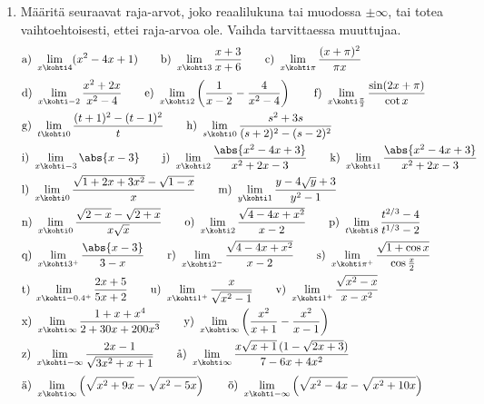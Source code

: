 \begin{enumerate}
\item
Määritä seuraavat raja-arvot, joko reaalilukuna tai muodossa $\pm\infty$, tai totea 
vaihtoehtoisesti, ettei raja-arvoa ole. Vaihda tarvittaessa muuttujaa.
\begin{align*}
&\text{a)}\ \lim_{x \kohti 4} (x^2-4x+1) \qquad
 \text{b)}\ \lim_{x \kohti 3} \frac{x+3}{x+6} \qquad
 \text{c)}\ \lim_{x\kohti\pi} \frac{(x+\pi)^2}{\pi x} \\[1mm]
&\text{d)}\ \lim_{x \kohti -2} \frac{x^2+2x}{x^2-4} \qquad
 \text{e)}\ \lim_{x \kohti 2} \left(\frac{1}{x-2}-\frac{4}{x^2-4}\right) \qquad
 \text{f)}\ \lim_{x \kohti \frac{\pi}{2}} \frac{\sin(2x+\pi)}{\cot x} \\
&\text{g)}\ \lim_{t \kohti 0} \frac{(t+1)^2-(t-1)^2}{t} \qquad
 \text{h)}\ \lim_{s \kohti 0} \frac{s^2+3s}{(s+2)^2-(s-2)^2} \\
&\text{i)}\ \lim_{x \kohti -3} \abs{x-3} \qquad
 \text{j)}\ \lim_{x \kohti 2} \frac{\abs{x^2-4x+3}}{x^2+2x-3} \qquad
 \text{k)}\ \lim_{x \kohti 1} \frac{\abs{x^2-4x+3}}{x^2+2x-3} \\
&\text{l)}\ \lim_{x \kohti 0} \frac{\sqrt{1+2x+3x^2}-\sqrt{1-x}}{x} \qquad
 \text{m)}\ \lim_{y \kohti 1} \frac{y-4\sqrt{y}+3}{y^2-1} \\
&\text{n)}\ \lim_{x \kohti 0} \frac{\sqrt{2-x}-\sqrt{2+x}}{x\sqrt{x}} \qquad
 \text{o)}\ \lim_{x \kohti 2} \frac{\sqrt{4-4x+x^2}}{x-2} \qquad 
 \text{p)}\ \lim_{t \kohti 8} \frac{t^{2/3}-4}{t^{1/3}-2} \\
&\text{q)}\ \lim_{x \kohti 3^+} \frac{\abs{x-3}}{3-x} \qquad
 \text{r)}\ \lim_{x \kohti 2^-} \frac{\sqrt{4-4x+x^2}}{x-2} \qquad
 \text{s)}\ \lim_{x \kohti \pi^+} \frac{\sqrt{1+\cos x}}{\cos\frac{x}{2}} \\
&\text{t)}\ \lim_{x \kohti -0.4^+} \frac{2x+5}{5x+2} \qquad
 \text{u)}\ \lim_{x \kohti 1^+} \frac{x}{\sqrt{x^2-1}} \qquad
 \text{v)}\ \lim_{x \kohti 1^+} \frac{\sqrt{x^2-x}}{x-x^2} \\
&\text{x)}\ \lim_{x\kohti\infty} \frac{1+x+x^4}{2+30x+200x^3} \qquad
 \text{y)}\ \lim_{x\kohti\infty} \left(\frac{x^2}{x+1}-\frac{x^2}{x-1}\right) \\
&\text{z)}\ \lim_{x \kohti -\infty} \frac{2x-1}{\sqrt{3x^2+x+1}} \qquad
 \text{å)}\ \lim_{x\kohti\infty} \frac{x\sqrt{x+1}\,(1-\sqrt{2x+3})}{7-6x+4x^2} \\[1mm]
&\text{ä)}\ \lim_{x\kohti\infty} \left(\sqrt{x^2+9x}-\sqrt{x^2-5x}\right) \qquad
 \text{ö)}\ \lim_{x \kohti -\infty} \left(\sqrt{x^2-4x}-\sqrt{x^2+10x}\right)
\end{align*}


\end{enumerate}
